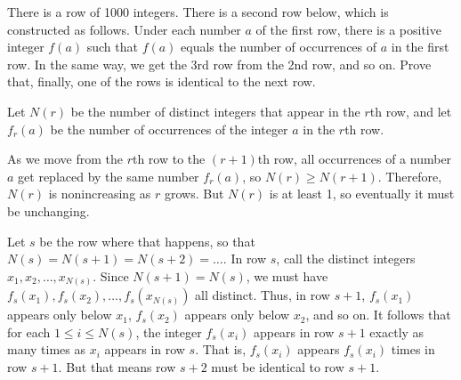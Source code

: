 \begin{problem}
There is a row of 1000 integers. There is a second row below, which is constructed as follows. Under each number $a$ of the first row, there is a positive integer $f(a)$ such that $f(a)$ equals the number of occurrences of $a$ in the first row. In the same way, we get the 3rd row from the 2nd row, and so on. Prove that, finally, one of the rows is identical to the next row.
\end{problem}

Let $N(r)$ be the number of distinct integers that appear in the $r$th row, and let $f_r(a)$ be the number of occurrences of the integer $a$ in the $r$th row.

As we move from the $r$th row to the $(r+1)$th row, all occurrences of a number $a$ get replaced by the same number $f_r(a)$, so $N(r) \geq N(r+1)$. Therefore, $N(r)$ is nonincreasing as $r$ grows. But $N(r)$ is at least 1, so eventually it must be unchanging.

Let $s$ be the row where that happens, so that $N(s) = N(s+1) = N(s + 2) = \dots$. In row $s$, call the distinct integers $x_1, x_2, \dots, x_{N(s)}$. Since $N(s+1) = N(s)$, we must have $f_s(x_1), f_s(x_2), \dots, f_s(x_{N(s)})$ all distinct. Thus, in row $s+1$, $f_s(x_1)$ appears only below $x_1$, $f_s(x_2)$ appears only below $x_2$, and so on. It follows that for each $1 \leq i \leq N(s)$, the integer $f_s(x_i)$ appears in row $s+1$ exactly as many times as $x_i$ appears in row $s$. That is, $f_s(x_i)$ appears $f_s(x_i)$ times in row $s + 1$. But that means row $s + 2$ must be identical to row $s + 1$.